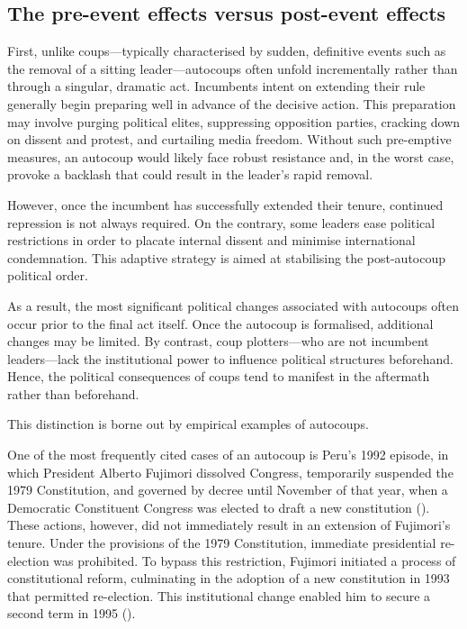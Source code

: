 \documentclass[
  12pt,
]{report}
\begin{document}
\subsection*{\texorpdfstring{\textbf{The pre-event effects versus
post-event
effects}}{The pre-event effects versus post-event effects}}\label{the-pre-event-effects-versus-post-event-effects}

First, unlike coups---typically characterised by sudden, definitive
events such as the removal of a sitting leader---autocoups often unfold
incrementally rather than through a singular, dramatic act. Incumbents
intent on extending their rule generally begin preparing well in advance
of the decisive action. This preparation may involve purging political
elites, suppressing opposition parties, cracking down on dissent and
protest, and curtailing media freedom. Without such pre-emptive
measures, an autocoup would likely face robust resistance and, in the
worst case, provoke a backlash that could result in the leader's rapid
removal.

However, once the incumbent has successfully extended their tenure,
continued repression is not always required. On the contrary, some
leaders ease political restrictions in order to placate internal dissent
and minimise international condemnation. This adaptive strategy is aimed
at stabilising the post-autocoup political order.

As a result, the most significant political changes associated with
autocoups often occur prior to the final act itself. Once the autocoup
is formalised, additional changes may be limited. By contrast, coup
plotters---who are not incumbent leaders---lack the institutional power
to influence political structures beforehand. Hence, the political
consequences of coups tend to manifest in the aftermath rather than
beforehand.

This distinction is borne out by empirical examples of autocoups.

One of the most frequently cited cases of an autocoup is Peru's 1992
episode, in which President Alberto Fujimori dissolved Congress,
temporarily suspended the 1979 Constitution, and governed by decree
until November of that year, when a Democratic Constituent Congress was
elected to draft a new constitution (). These actions, however, did not immediately result
in an extension of Fujimori's tenure. Under the provisions of the 1979
Constitution, immediate presidential re-election was prohibited. To
bypass this restriction, Fujimori initiated a process of constitutional
reform, culminating in the adoption of a new constitution in 1993 that
permitted re-election. This institutional change enabled him to secure a
second term in 1995 ().
\end{document}
